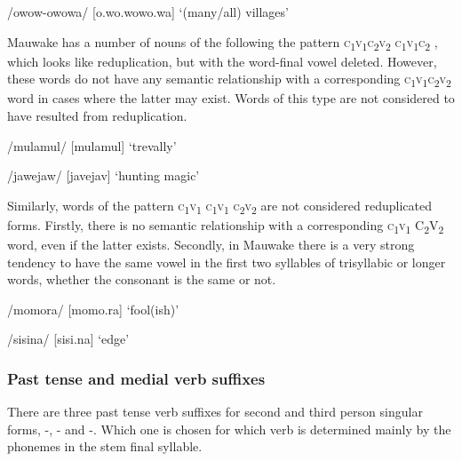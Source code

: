 /owow-owowa/  [o.{{\textprimstress}}wo.wo{{\textprimstress}}{{\textprimstress}}wo.wa]  `(many/all) villages'

Mauwake has a number of nouns of the following the pattern \textsc{c}\textsubscript{1}\textsc{v}\textsubscript{1}\textsc{c}\textsubscript{2}\textsc{v}\textsubscript{2} \textsc{c}\textsubscript{1}\textsc{v}\textsubscript{1}\textsc{c}\textsubscript{2} , which looks like reduplication, but with the word-final vowel deleted.  However, these words do not have any semantic relationship with a corresponding \textsc{c}\textsubscript{1}\textsc{v}\textsubscript{1}\textsc{c}\textsubscript{2}\textsc{v}\textsubscript{2} word in cases where the latter may exist.  Words of this type are not considered to have resulted from reduplication.

/mulamul/  [mu{{\textprimstress}lamul}]  `trevally'

/jawejaw/  [ja{{\textprimstress}vejav}]  `hunting magic'

Similarly, words of the pattern \textsc{c}\textsubscript{1}\textsc{v}\textsubscript{1} \textsc{c}\textsubscript{1}\textsc{v}\textsubscript{1} \textsc{c}\textsubscript{2}\textsc{v}\textsubscript{2} are not considered reduplicated forms.  Firstly, there is no semantic relationship with a corresponding \textsc{c}\textsubscript{1}\textsc{v}\textsubscript{1} C\textsubscript{2}V\textsubscript{2} word, even if the latter exists. Secondly, in Mauwake there is a very strong tendency to have the same vowel in the first two syllables of trisyllabic or longer words, whether the consonant is the same or not. 

/momora/  [mo{{\textprimstress}mo.ra}]  `fool(ish)'

/sisina/  [si{{\textprimstress}si.na}]  `edge'

\subsubsection[Past tense and medial verb suffixes]{Past tense and medial verb suffixes}\footnotemark{}

There are three past tense verb suffixes for second and third person singular forms, -, - and -.  Which one is chosen for which verb is determined mainly by the phonemes in the stem final syllable. 

